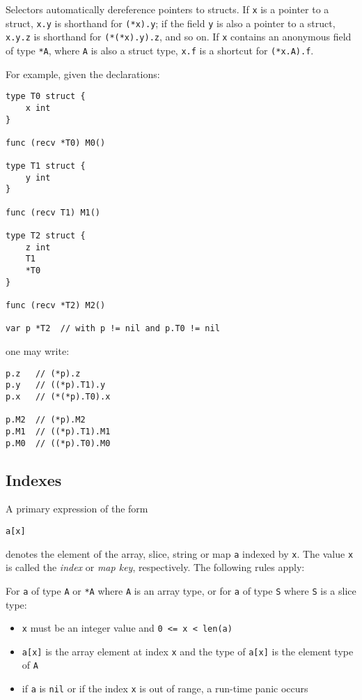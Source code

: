 Selectors automatically dereference
pointers to structs. If \texttt{x} is a pointer to a struct,
\texttt{x.y} is shorthand for \texttt{(*x).y}; if the field \texttt{y}
is also a pointer to a struct, \texttt{x.y.z} is shorthand for
\texttt{(*(*x).y).z}, and so on. If \texttt{x} contains an anonymous
field of type \texttt{*A}, where \texttt{A} is also a struct type,
\texttt{x.f} is a shortcut for \texttt{(*x.A).f}.

For example, given the declarations:

\begin{Verbatim}[frame=single]
type T0 struct {
    x int
}

func (recv *T0) M0()

type T1 struct {
    y int
}

func (recv T1) M1()

type T2 struct {
    z int
    T1
    *T0
}

func (recv *T2) M2()

var p *T2  // with p != nil and p.T0 != nil
\end{Verbatim}

one may write:

\begin{Verbatim}[frame=single]
p.z   // (*p).z
p.y   // ((*p).T1).y
p.x   // (*(*p).T0).x

p.M2  // (*p).M2
p.M1  // ((*p).T1).M1
p.M0  // ((*p).T0).M0
\end{Verbatim}

\subsection*{Indexes}

A primary expression of the form

\begin{Verbatim}[frame=single]
a[x]
\end{Verbatim}

denotes the element of the array, slice, string or map \texttt{a}
indexed by \texttt{x}. The value \texttt{x} is called the \emph{index}
or \emph{map key}, respectively. The following rules apply:

For \texttt{a} of type \texttt{A} or \texttt{*A} where \texttt{A} is an
array type, or for \texttt{a} of type
\texttt{S} where \texttt{S} is a slice type:

\begin{itemize}
\item
  \texttt{x} must be an integer value and
  \texttt{0 \textless{}= x \textless{} len(a)}
\item
  \texttt{a{[}x{]}} is the array element at index \texttt{x} and the
  type of \texttt{a{[}x{]}} is the element type of \texttt{A}
\item
  if \texttt{a} is \texttt{nil} or if the index \texttt{x} is out of
  range, a run-time panic occurs
\end{itemize}

